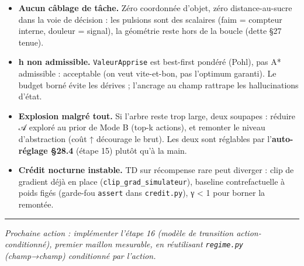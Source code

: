 \documentclass[
  french,
  11pt,
]{article}
\providecommand{\tightlist}{%
  \setlength{\itemsep}{0pt}\setlength{\parskip}{0pt}}
\begin{document}
\begin{itemize}
\tightlist
\item
  \textbf{Aucun câblage de tâche.} Zéro coordonnée d'objet, zéro
  distance-au-sucre dans la voie de décision : les pulsions sont des
  scalaires (faim = compteur interne, douleur = signal), la géométrie
  reste hors de la boucle (dette §27 tenue).
\item
  \textbf{h non admissible.} \texttt{ValeurApprise} est best-first
  pondéré (Pohl), pas A* admissible : acceptable (on veut vite-et-bon,
  pas l'optimum garanti). Le budget borné évite les dérives ; l'ancrage
  au champ rattrape les hallucinations d'état.
\item
  \textbf{Explosion malgré tout.} Si l'arbre reste trop large, deux
  soupapes : réduire 𝒜 exploré au prior de Mode B (top-k actions), et
  remonter le niveau d'abstraction (coût ↑ décourage le brut). Les deux
  sont réglables par l'\textbf{auto-réglage §28.4} (étape 15) plutôt
  qu'à la main.
\item
  \textbf{Crédit nocturne instable.} TD sur récompense rare peut
  diverger : clip de gradient déjà en place
  (\texttt{clip\_grad\_simulateur}), baseline contrefactuelle à poids
  figés (garde-fou \texttt{assert} dans \texttt{credit.py}), γ
  \textless{} 1 pour borner la remontée.
\end{itemize}

\begin{center}\rule{0.5\linewidth}{0.5pt}\end{center}

\emph{Prochaine action : implémenter l'étape 16 (modèle de transition
action-conditionné), premier maillon mesurable, en réutilisant
\texttt{regime.py} (champ→champ) conditionné par l'action.}
\end{document}
